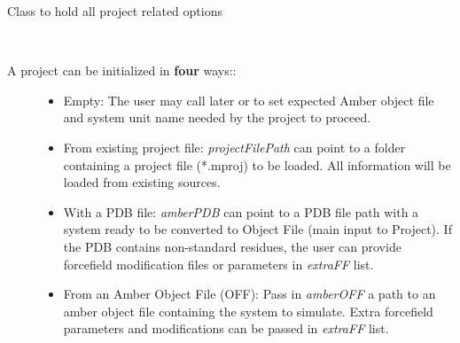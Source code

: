 \documentclass[letterpaper,10pt,english]{sphinxmanual}
\begin{document}
\begin{fulllineitems}
\label{project:pyMDMix.Project.Project}
Class to hold all project related options

\begin{fulllineitems}
\label{project:pyMDMix.Project.Project.__init__}~\begin{description}
\item[{A project can be initialized in \textbf{four} ways::}] \leavevmode\begin{itemize}
\item {} 
Empty: The user may call later {\hyperref[project:pyMDMix.Project.Project.setOFF]{}} or {\hyperref[project:pyMDMix.Project.Project.createOFFFromPDB]{}} to set expected Amber object file and system unit name needed by the project to proceed.

\item {} 
From existing project file: \emph{projectFilePath} can point to a folder containing a project file (*.mproj) to be loaded. All information will be loaded from existing sources.

\item {} 
With a PDB file: \emph{amberPDB} can point to a PDB file path with a system ready to be converted to Object File (main input to Project). If the PDB contains non-standard residues, the user can provide forcefield modification files or parameters in \emph{extraFF} list.

\item {} 
From an Amber Object File (OFF): Pass in \emph{amberOFF} a path to an amber object file containing the system to simulate. Extra forcefield parameters and modifications can be passed in \emph{extraFF} list.

\end{itemize}


\end{description}
\end{fulllineitems}
\end{fulllineitems}
\end{document}
